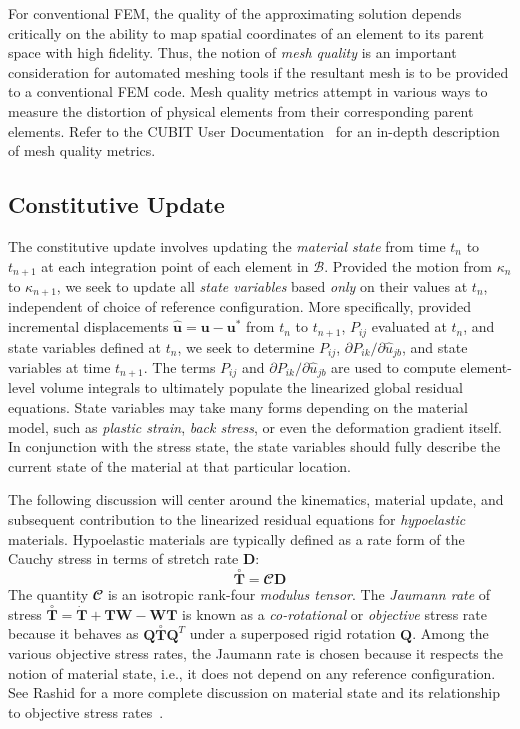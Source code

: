 For conventional FEM, the quality of the approximating solution depends critically on the ability to map spatial coordinates of an element to its parent space with high fidelity. Thus, the notion of \textit{mesh quality} is an important consideration for automated meshing tools if the resultant mesh is to be provided to a conventional FEM code. Mesh quality metrics attempt in various ways to measure the distortion of physical elements from their corresponding parent elements. Refer to the CUBIT User Documentation~\cite{cubit_2018} for an in-depth description of mesh quality metrics.

\subsection{Constitutive Update}

The constitutive update involves updating the \textit{material state} from time $t_n$ to $t_{n+1}$ at each integration point of each element in $\mathcal{B}$. Provided the motion from $\kappa_n$ to $\kappa_{n+1}$, we seek to update all \textit{state variables} based \textit{only} on their values at $t_n$, independent of choice of reference configuration. More specifically, provided incremental displacements $\hat{\bm{u}} = \bm{u} - \bm{u}^*$ from $t_n$ to $t_{n+1}$, $P_{ij}$ evaluated at $t_n$, and state variables defined at $t_n$, we seek to determine $P_{ij}$, $\partial{P_{ik}}/\partial{\hat{u}_{jb}}$, and state variables at time $t_{n+1}$. The terms $P_{ij}$ and $\partial{P_{ik}}/\partial{\hat{u}_{jb}}$ are used to compute element-level volume integrals to ultimately populate the linearized global residual equations. State variables may take many forms depending on the material model, such as \textit{plastic strain}, \textit{back stress}, or even the deformation gradient itself. In conjunction with the stress state, the state variables should fully describe the current state of the material at that particular location.

The following discussion will center around the kinematics, material update, and subsequent contribution to the linearized residual equations for \textit{hypoelastic} materials. Hypoelastic materials are typically defined as a rate form of the Cauchy stress in terms of stretch rate $\bm{D}$:
\begin{equation}
\overset{\circ}{\bm{T}} =  {\mathbfcal{C}}\bm{D}
\end{equation}
The quantity ${\mathbfcal{C}}$ is an isotropic rank-four \textit{modulus tensor}. The \textit{Jaumann rate} of stress $\overset{\circ}{\bm{T}} = \dot{\bm{T}} + \bm{T}\bm{W} - \bm{W}\bm{T}$ is known as a \textit{co-rotational} or \textit{objective} stress rate because it behaves as $\bm{Q}\overset{\circ}{\bm{T}}\bm{Q}^T$ under a superposed rigid rotation $\bm{Q}$. Among the various objective stress rates, the Jaumann rate is chosen because it respects the notion of material state, i.e., it does not depend on any reference configuration. See Rashid for a more complete discussion on material state and its relationship to objective stress rates~\cite{rashid_1991}.

